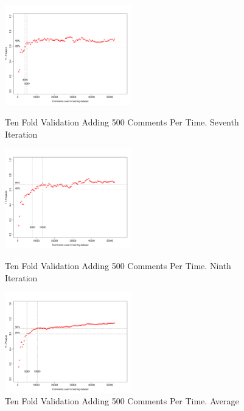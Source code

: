 \clearpage
\begin{figure}[thb!]
  \centering
  \vspace{-3mm}
  \includegraphics[width=0.49\textwidth]{figures/appendix/ten_fold_validation_requirement/ten_fold_validation_6_500.pdf}
  \vspace{-5mm}
  \caption{Ten Fold Validation Adding 500 Comments Per Time. Seventh Iteration}
  \label{fig:requirement_ten_fold_validation_6_100}
  \includegraphics[width=0.49\textwidth]{figures/appendix/ten_fold_validation_requirement/ten_fold_validation_8_500.pdf}
  \vspace{-5mm}
  \caption{Ten Fold Validation Adding 500 Comments Per Time. Ninth Iteration}
  \label{fig:requirement_ten_fold_validation_8_100}
  \includegraphics[width=0.49\textwidth]{figures/appendix/ten_fold_validation_requirement/ten_fold_validation_average_500.pdf}
  \vspace{-5mm}
  \caption{Ten Fold Validation Adding 500 Comments Per Time. Average}
  \label{fig:requirement_ten_fold_validation_average_100}
\end{figure}

